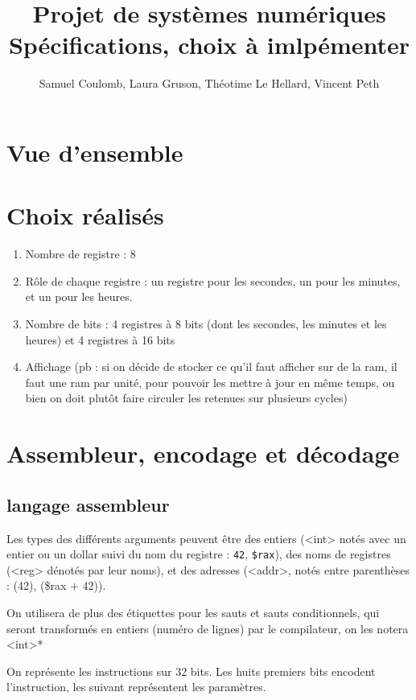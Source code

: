 \documentclass{article}
\title{Projet de systèmes numériques \\ Spécifications, choix à imlpémenter}
\author{Samuel Coulomb, Laura Gruson, Théotime Le Hellard, Vincent Peth}
\begin{document}
\maketitle

\section{Vue d’ensemble}



\section{Choix réalisés}
\begin{enumerate}
    \item Nombre de registre : 8
    \item Rôle de chaque registre : un registre pour les secondes, un pour les minutes, et un pour les heures.
    \item Nombre de bits : 4 registres à 8 bits (dont les secondes, les minutes et les heures) et 4 registres à 16 bits
    \item Affichage (pb : si on décide de stocker ce qu’il faut afficher sur de la ram, il faut une ram par unité, pour pouvoir les mettre à jour en même temps, ou bien on doit plutôt faire circuler les retenues sur plusieurs cycles)
\end{enumerate}


\section{Assembleur, encodage et décodage}
\subsection{langage assembleur}

Les types des différents arguments peuvent être des entiers (<int> notés avec un entier ou un dollar suivi du nom du registre : \texttt{42}, \texttt{\$rax}), des noms de registres (<reg> dénotés par leur noms), et des adresses (<addr>, notés entre parenthèses : (42), (\$rax + 42)).

On utilisera de plus des étiquettes pour les sauts et sauts conditionnels, qui seront transformés en entiers (numéro de lignes) par le compilateur, on les notera <int>*

On représente les instructions sur 32 bits. Les huits premiers bits encodent l’instruction, les suivant représentent les paramètres.
\end{document}

